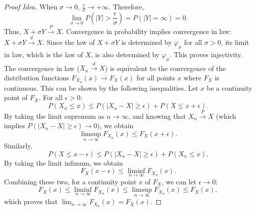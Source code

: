 \begin{proof}[Proof Idea]
When $\sigma \to 0$, $\frac{\epsilon}{\sigma} \to +\infty$. Therefore,
\[ \lim_{\sigma \to 0} P\left(|Y| > \frac{\epsilon}{\sigma}\right) = P(|Y| = \infty) = 0. \]
Thus, $X+\sigma Y \xrightarrow{P} X$.
Convergence in probability implies convergence in law: $X+\sigma Y \xrightarrow{d} X$.
Since the law of $X+\sigma Y$ is determined by $\varphi_\mu$ for all $\sigma>0$, its limit in law, which is the law of $X$, is also determined by $\varphi_\mu$. This proves injectivity.
The convergence in law ($X_n \xrightarrow{d} X$) is equivalent to the convergence of the distribution functions $F_{X_n}(x) \to F_X(x)$ for all points $x$ where $F_X$ is continuous. This can be shown by the following inequalities.
Let $x$ be a continuity point of $F_X$. For all $\epsilon > 0$:
\[ P(X_n \le x) \le P(|X_n - X| \ge \epsilon) + P(X \le x+\epsilon). \]
By taking the limit supremum as $n \to \infty$, and knowing that $X_n \xrightarrow{P} X$ (which implies $P(|X_n - X| \ge \epsilon) \to 0$), we obtain
\[ \limsup_{n\to\infty} F_{X_n}(x) \le F_X(x+\epsilon). \]
Similarly,
\[ P(X \le x-\epsilon) \le P(|X_n - X| \ge \epsilon) + P(X_n \le x). \]
By taking the limit infimum, we obtain
\[ F_X(x-\epsilon) \le \liminf_{n\to\infty} F_{X_n}(x). \]
Combining these two, for a continuity point $x$ of $F_X$, we can let $\epsilon \to 0$:
\[ F_X(x) \le \liminf_{n\to\infty} F_{X_n}(x) \le \limsup_{n\to\infty} F_{X_n}(x) \le F_X(x), \]
which proves that $\lim_{n\to\infty} F_{X_n}(x) = F_X(x)$.
\end{proof}

